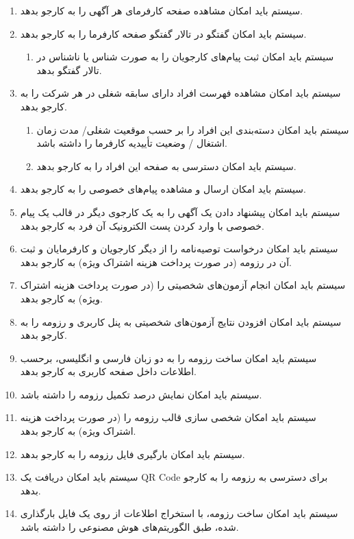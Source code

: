 \documentclass[12pt]{article}
\begin{document}
\begin{itemize}
\begin{enumerate}
			\item سیستم باید امکان مشاهده صفحه کارفرمای هر آگهی را به کارجو بدهد.
			\item سیستم باید امکان گفتگو در تالار گفتگو صفحه کارفرما را به کارجو بدهد.
			\begin{enumerate}
				\renewcommand{\labelenumii}{-R\arabic{enumi}.\arabic{enumii}}
				\item سیستم باید امکان ثبت پیام‌های کارجویان را به صورت شناس یا ناشناس در تالار گفتگو بدهد.
			\end{enumerate}
			\item سیستم باید امکان مشاهده فهرست افراد دارای سابقه شغلی در هر شرکت را به کارجو بدهد.
			\begin{enumerate}
				\renewcommand{\labelenumii}{-R\arabic{enumi}.\arabic{enumii}}
				\item سیستم باید امکان دسته‌بندی این افراد را بر حسب موقعیت شغلی/ مدت زمان اشتغال / وضعیت تأییدیه کارفرما را داشته باشد.
				\item سیستم باید امکان دسترسی به صفحه این افراد را به کارجو بدهد.
			\end{enumerate}
			\item سیستم باید امکان ارسال و مشاهده پیام‌های خصوصی را به کارجو بدهد.
			\item سیستم باید امکان پیشنهاد دادن یک آگهی را به یک کارجوی دیگر در قالب یک پیام خصوصی با وارد کردن پست الکترونیک آن فرد به کارجو بدهد.
			\item سیستم باید امکان درخواست توصیه‌نامه را از دیگر کارجویان و کارفرمایان و ثبت آن در رزومه (در صورت پرداخت هزینه اشتراک ویژه) به کارجو بدهد.
			\item سیستم باید امکان انجام آزمون‌های شخصیتی را (در صورت پرداخت هزینه اشتراک ویژه) به کارجو بدهد.
			\item سیستم باید امکان افزودن نتایج آزمون‌های شخصیتی به پنل کاربری و رزومه را به کارجو بدهد.
			\item سیستم باید امکان ساخت رزومه را به دو زبان فارسی و انگلیسی، برحسب اطلاعات داخل صفحه کاربری به کارجو بدهد.
			\item سیستم باید امکان نمایش درصد تکمیل رزومه را داشته باشد.
			\item سیستم باید امکان شخصی سازی قالب رزومه را (در صورت پرداخت هزینه اشتراک ویژه) به کارجو بدهد.
			\item سیستم باید امکان بارگیری فایل رزومه را به کارجو بدهد.
			\item سیستم باید امکان دریافت یک QR Code برای دسترسی به رزومه را به کارجو بدهد.
			\item سیستم باید امکان ساخت رزومه، با استخراج اطلاعات از روی یک فایل بارگذاری شده، طبق الگوریتم‌های هوش مصنوعی را داشته باشد.

\end{enumerate}
\end{itemize}
\end{document}
